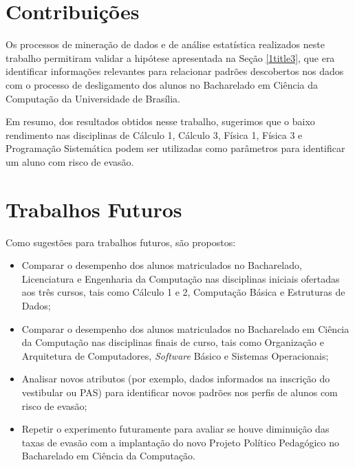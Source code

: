 \section{Contribuições} 

Os processos de mineração de dados e de análise estatística realizados neste trabalho permitiram validar a hipótese apresentada na Seção \ref{1title3}, que era identificar informações relevantes para relacionar padrões descobertos nos dados com o processo de desligamento dos alunos no Bacharelado em Ciência da Computação da Universidade de Brasília.

Em resumo, dos resultados obtidos nesse trabalho, sugerimos que o baixo rendimento nas disciplinas de Cálculo 1, Cálculo 3, Física 1, Física 3 e Programação Sistemática podem ser utilizadas como parâmetros para identificar um aluno com risco de evasão.

\section{Trabalhos Futuros}

Como sugestões para trabalhos futuros, são propostos:

\begin{itemize}

	\item Comparar o desempenho dos alunos matriculados no Bacharelado, Licenciatura e Engenharia da Computação nas disciplinas iniciais ofertadas aos três cursos, tais como Cálculo 1 e 2, Computação Básica e Estruturas de Dados;
	\item Comparar o desempenho dos alunos matriculados no Bacharelado em Ciência da Computação nas disciplinas finais de curso, tais como Organização e Arquitetura de Computadores, \textit{Software} Básico e Sistemas Operacionais;
	\item Analisar novos atributos (por exemplo, dados informados na inscrição do vestibular ou PAS) para identificar novos padrões nos perfis de alunos com risco de evasão;
	\item Repetir o experimento futuramente para avaliar se houve diminuição das taxas de evasão com a implantação do novo Projeto Político Pedagógico no Bacharelado em Ciência da Computação.
\end{itemize}
